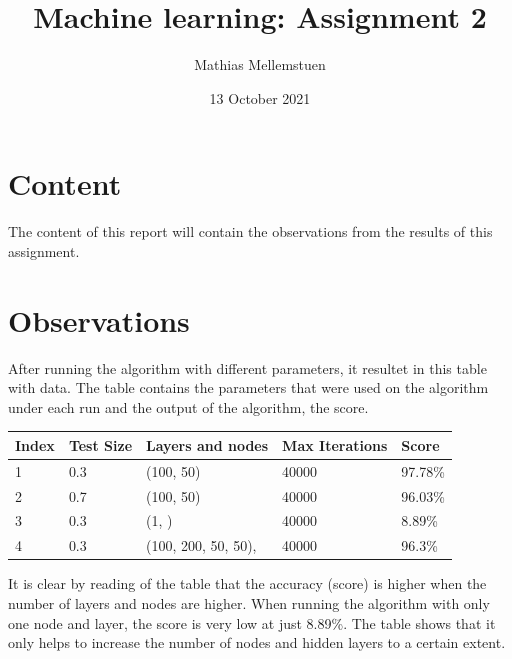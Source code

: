 \documentclass[titlepage, 11pt]{article}
\title{Machine learning: Assignment 2}
\author{Mathias Mellemstuen}
\date{13 October 2021}
\begin{document}
    \maketitle

    \section{Content}
    The content of this report will contain the observations from the results of this assignment. 
    \section{Observations}
    After running the algorithm with different parameters, it resultet in this table with data. The table contains the parameters that were used on the algorithm under each run and the output of the algorithm, the score.
    \begin{table}[h!]
        \label{tab:table1}
        \begin{tabular}{|l|l|l|l|l|}
            \hline
            \textbf{Index} & \textbf{Test Size} & \textbf{Layers and nodes} & \textbf{Max Iterations} & \textbf{Score} \\ \hline
            1 & 0.3 & (100, 50) & 40000 & 97.78\% \\ \hline
            2 & 0.7 & (100, 50) & 40000 & 96.03\% \\ \hline
            3 & 0.3 & (1, ) & 40000 & 8.89\% \\ \hline
            4 & 0.3 & (100, 200, 50, 50), & 40000 & 96.3\% \\ \hline
        \end{tabular}
    \end{table}
    It is clear by reading of the table that the accuracy (score) is higher when the number of layers and nodes are higher. When running the algorithm with only one node and layer, the score is very low at just 8.89\%. The table shows that it only helps to increase the number of nodes and hidden layers to a certain extent. 
\end{document}
